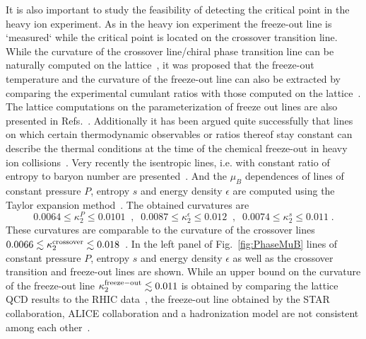\documentclass{PoS}
\begin{document}
It is also important to study the feasibility of detecting the critical point in the heavy ion experiment. As in the heavy ion experiment the freeze-out line is `measured` while the critical point is located on the crossover transition line.
While the curvature of the crossover line/chiral phase transition line can be naturally computed on the lattice~\cite{Kaczmarek:2011zz,Endrodi:2011gv,Bonati:2014rfa,Cea:2015cya,Bellwied:2015rza}, it was proposed that the freeze-out temperature and the curvature of the freeze-out line can also be extracted by comparing the experimental cumulant ratios with those computed on the lattice~\cite{Bazavov:2012vg,Bazavov:2014xya, Bazavov:2015zja}. The lattice computations on the parameterization of freeze out lines are also presented in Refs.~\cite{Borsanyi:2013hza,Bazavov:2014xya,Borsanyi:2014ewa,Bellwied:2016cpq}.  Additionally it has been argued quite successfully that lines on which certain thermodynamic observables or ratios thereof stay constant can describe the thermal conditions at the time of the chemical freeze-out in heavy ion collisions~\cite{Cleymans:1999st,Cleymans:2005xv}. Very recently the isentropic lines, i.e. with constant ratio of entropy to baryon number are presented~\cite{Gunther:2016vcp}. And the $\mu_B$ dependences of lines of constant pressure $P$, entropy $s$ and energy density $\epsilon$ are computed using the Taylor expansion method~\cite{Bazavov:2017dus}. The obtained curvatures are 
\begin{equation}
0.0064 \le \kappa_2^P  \le 0.0101 \;\; ,\;\; 
0.0087 \le \kappa_2^\epsilon  \le 0.012  \;\; ,\;\;
0.0074 \le \kappa_2^s  \le 0.011 \; .
\label{kappa2}
\end{equation}
These curvatures are comparable to the curvature of the crossover lines $0.0066\lesssim\kappa_{2}^{\rm crossover}\lesssim0.018$~\cite{Kaczmarek:2011zz,Endrodi:2011gv,Bonati:2014rfa,Cea:2015cya,Bellwied:2015rza}.
In the left panel of Fig.~\ref{fig:PhaseMuB} lines of constant pressure $P$, entropy $s$ and energy density $\epsilon$ as well as the crossover transition and freeze-out lines are shown. While an upper bound on the curvature of the freeze-out line $\kappa_2^{\rm freeze-out}\lesssim 0.011$ is obtained by comparing the lattice QCD results to the RHIC data~\cite{Bazavov:2015zja}, the freeze-out line obtained by the STAR collaboration, ALICE collaboration and a hadronization model are not consistent among each other~\cite{Das:2014qca,Floris:2014pta,Becattini:2016xct}.
\end{document}
